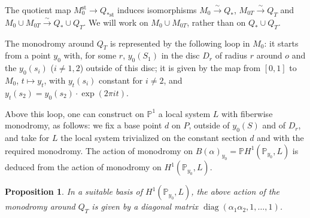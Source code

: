 \documentclass[12pt,a4paper]{article}
\theoremstyle{plain}
\newtheorem{proposition}[theorem]{Proposition}
\theoremstyle{definition}
\theoremstyle{remark}
\DeclareMathOperator{\diag}{diag}
\begin{document}
The quotient map $M_0^\text{st} \to Q_{*\text{st}}$ induces isomorphisms $M_0 \xrightarrow{\sim} Q_*$, $M_{0T} \xrightarrow{\sim} Q_T$ and $M_0 \cup M_{0T} \xrightarrow{\sim} Q_* \cup Q_T$. We will work on $M_0 \cup M_{0T}$, rather than on $Q_* \cup Q_T$.

The monodromy around $Q_T$ is represented by the following loop in $M_0$: it starts from a point $y_0$ with, for some $r$, $y_0(S_1)$ in the disc $D_r$ of radius $r$ around $o$ and the $y_0(s_i)$ ($i \neq 1, 2$) outside of this disc; it is given by the map from $[0, 1]$ to $M_0$, $t \mapsto y_t$, with $y_t(s_i)$ constant for $i \neq 2$, and $y_t(s_2) = y_0(s_2) \cdot \exp(2\pi i t)$.

Above this loop, one can construct on $\mathbb{P}^1$ a local system $L$ with fiberwise monodromy, as follows: we fix a base point $d$ on $P$, outside of $y_0(S)$ and of $D_r$, and take for $L$ the local system trivialized on the constant section $d$ and with the required monodromy. The action of monodromy on $B(\alpha)_{y_0} = \mathbb{P}H^1(\mathbb{P}_{y_0}, L)$ is deduced from the action of monodromy on $H^1(\mathbb{P}_{y_0}, L)$.

\begin{proposition}
\label{9.2}
In a suitable basis of $H^1(\mathbb{P}_{y_0}, L)$, the above action of the monodromy around $Q_T$ is given by a diagonal matrix $\diag(\alpha_1 \alpha_2, 1, \ldots, 1)$.
\end{proposition}
\end{document}
